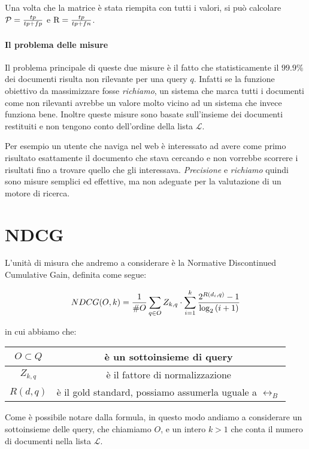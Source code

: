 Una volta che la matrice è stata riempita con tutti i valori, si può calcolare $\mathcal{P} = \frac{tp}{tp + fp}$ e $\text{R} = \frac{tp}{tp + fn}$.

\paragraph{Il problema delle misure}
Il problema principale di queste due misure è il fatto che statisticamente il $99.9\%$\cite{irbook} dei documenti
risulta non rilevante per una query $q$. 
Infatti se la funzione obiettivo da massimizzare fosse \textit{richiamo},
un sistema che marca tutti i documenti come non rilevanti avrebbe
un valore molto vicino ad un sistema che invece funziona bene. Inoltre
queste misure sono basate sull'insieme dei documenti restituiti e non tengono
conto dell'ordine della lista $\mathcal{L}$.

Per esempio un utente che naviga nel web è interessato
ad avere come primo risultato esattamente il documento che stava cercando
e non vorrebbe scorrere i risultati fino a trovare quello che gli interessava.
\textit{Precisione} e \textit{richiamo} quindi sono misure semplici ed effettive, ma non
adeguate per la valutazione di un motore di ricerca.

\section{NDCG}
L'unità di misura che andremo a considerare è la Normative Discontinued Cumulative Gain,
definita come segue:

$$\label{def:ndcg}
NDCG(O, k) = \frac{1}{\#O} \sum_{q \in O} Z_{k, q} \cdot \sum_{i=1}^{k} \frac{2^{R(d_i, q)} - 1}{\log_2{(i + 1)}} \\
$$

in cui abbiamo che:
\begin{table}[h!]
	\centering
	\begin{tabular}{|c|c|}
		\hline
		$ O \subset Q$ & è un sottoinsieme di query \\
		\hline
		$Z_{k,q}$ & è il fattore di normalizzazione \\
		\hline
		$R(d,q)$ & è il gold standard, possiamo assumerla uguale a $\rel_B$ \\
		\hline
	\end{tabular}
\end{table}

Come è possibile notare dalla formula, in questo modo andiamo a considerare un sottoinsieme delle query, che chiamiamo $O$,
e un intero $k>1$ che conta il numero di documenti nella lista $\mathcal{L}$.

